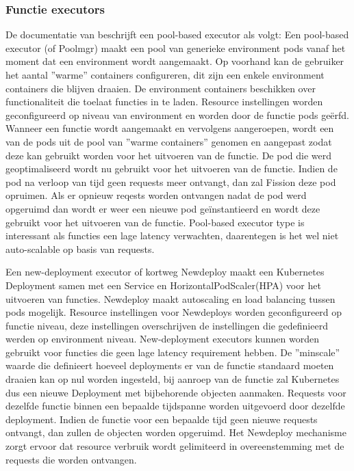 \subsubsection{Functie executors}
\label{sec:fission-executors}
\begin{description}[style=unboxed, labelwidth=\linewidth, listparindent =0pt]
    \item[Pool-based executor]
    De documentatie van \textcite{Fission2019} beschrijft een pool-based executor als volgt:
    Een pool-based executor (of Poolmgr) maakt een pool van generieke environment pods vanaf het moment dat een environment wordt aangemaakt. Op voorhand kan de gebruiker het aantal ''warme'' containers configureren, dit zijn een enkele environment containers die blijven draaien. De environment containers beschikken over functionaliteit die toelaat functies in te laden. Resource instellingen worden geconfigureerd op niveau van environment en worden door de functie pods geërfd. Wanneer een functie wordt aangemaakt en vervolgens aangeroepen, wordt een van de pods uit de pool van ''warme containers'' genomen en aangepast zodat deze kan gebruikt worden voor het uitvoeren van de functie. De pod die werd geoptimaliseerd wordt nu gebruikt voor het uitvoeren van de functie. Indien de pod na verloop van tijd geen requests meer ontvangt, dan zal Fission deze pod opruimen. Als er opnieuw reqests worden ontvangen nadat de pod werd opgeruimd dan wordt er weer een nieuwe pod geïnstantieerd en wordt deze gebruikt voor het uitvoeren van de functie. Pool-based executor type is interessant als functies een lage latency verwachten, daarentegen is het wel niet auto-scalable op basis van requests.
    \\
    
    \item[New-deployment executor]
    Een new-deployment executor of kortweg Newdeploy maakt een Kubernetes Deployment samen met een Service en HorizontalPodScaler(HPA) voor het uitvoeren van functies. Newdeploy maakt autoscaling en load balancing tussen pods mogelijk. Resource instellingen voor Newdeploys worden geconfigureerd op functie niveau, deze instellingen overschrijven de instellingen die gedefinieerd werden op environment niveau. New-deployment executors kunnen worden gebruikt voor functies die geen lage latency requirement hebben. De ''minscale'' waarde die definieert hoeveel deployments er van de functie standaard moeten draaien kan op nul worden ingesteld, bij aanroep van de functie zal Kubernetes dus een nieuwe Deployment met bijbehorende objecten aanmaken. Requests voor dezelfde functie binnen een bepaalde tijdspanne worden uitgevoerd door dezelfde deployment. Indien de functie voor een bepaalde tijd geen nieuwe requests ontvangt, dan zullen de objecten worden opgeruimd. Het Newdeploy mechanisme zorgt ervoor dat resource verbruik wordt gelimiteerd in overeenstemming met de requests die worden ontvangen.
    

\end{description}
